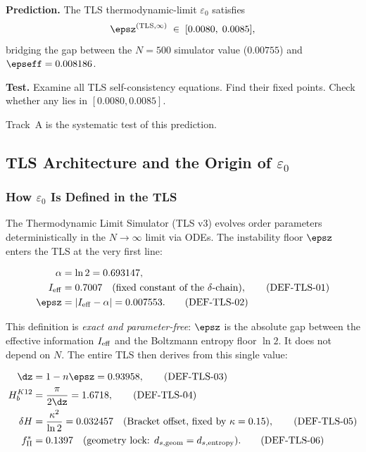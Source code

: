 \documentclass[12pt, a4paper]{article}
\begin{document}
\begin{formalbox}[title={PRED-ZC18-01: Registered Prediction (Post-ZC17 Council)}]
\textbf{Prediction.} The TLS thermodynamic-limit $\varepsilon_0$
satisfies
\[
  \epsz^{(\mathrm{TLS},\infty)} \;\in\; [0.0080,\; 0.0085],
\]
bridging the gap between the $N=500$ simulator value ($0.00755$)
and $\epseff = 0.008186$.

\textbf{Test.} Examine all TLS self-consistency equations.
Find their fixed points.
Check whether any lies in $[0.0080,0.0085]$.
\end{formalbox}

Track~A is the systematic test of this prediction.

\subsection{TLS Architecture and the Origin of $\varepsilon_0$}
\label{zc18a:sec:tls}

\subsubsection{How $\varepsilon_0$ Is Defined in the TLS}

The Thermodynamic Limit Simulator (TLS v3) evolves order parameters
deterministically in the $N\to\infty$ limit via ODEs.
The instability floor $\epsz$ enters the TLS at the very first line:

\begin{formalbox}[title={TLS Definition of $\varepsilon_0$ (CRF\_TLS\_v3.py)}]
\begin{align}
  \alpha &= \ln 2 = 0.693147, \notag\\
  I_{\rm eff} &= 0.7007 \quad\text{(fixed constant of the $\delta$-chain)},
  \tag{DEF-TLS-01}\\
  \epsz &= |I_{\rm eff} - \alpha| = 0.007553.
  \tag{DEF-TLS-02}
\end{align}
\end{formalbox}

\noindent
This definition is \emph{exact and parameter-free}: $\epsz$ is the
absolute gap between the effective information $I_{\rm eff}$ and the
Boltzmann entropy floor $\ln 2$.
It does not depend on $N$.
The entire TLS then derives from this single value:

\begin{align}
  \dz &= 1 - n\epsz = 0.93958,
  \tag{DEF-TLS-03}\\
  H_{b}^{K12} &= \frac{\pi}{2\dz} = 1.6718,
  \tag{DEF-TLS-04}\\
  \delta H &= \frac{\kappa^2}{\ln 2} = 0.032457
  \quad\text{(Bracket offset, fixed by $\kappa=0.15$)},
  \tag{DEF-TLS-05}\\
  f_{\rm II}^* &= 0.1397
  \quad\text{(geometry lock: $d_{s,\rm geom}=d_{s,\rm entropy}$)}.
  \tag{DEF-TLS-06}
\end{align}
\end{document}
